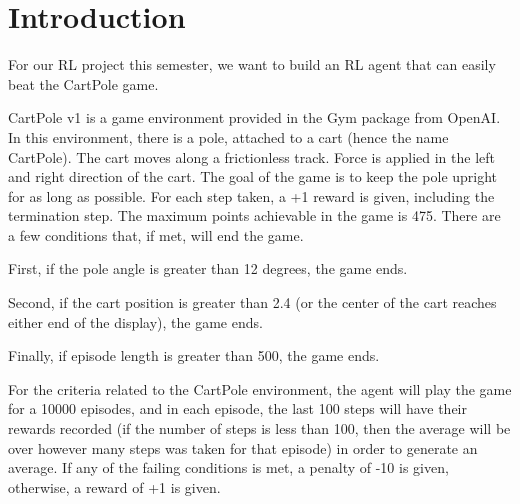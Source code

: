 \section{Introduction}

For our RL project this semester, we want to build an RL agent that can easily beat the CartPole game.  

CartPole v1 is a game environment provided in the Gym package from OpenAI. In this environment, there is a pole, attached to a cart (hence the name CartPole). The cart moves along a frictionless track. Force is applied in the left and right direction of the cart.
The goal of the game is to keep the pole upright for as long as possible. For each step taken, a +1 reward is given, including the termination step. The maximum points achievable in the game is 475. There are a few conditions that, if met, will end the game.

First, if the pole angle is greater than 12 degrees, the game ends.

Second, if the cart position is greater than 2.4 (or the center of the cart reaches either end of the display), the game ends.

Finally, if episode length is greater than 500, the game ends.

For the criteria related to the CartPole environment, the agent will play the game for a 10000 episodes, and in each episode, the last 100 steps will have their rewards recorded (if the number of steps is less than 100, then the average will be over however many steps was taken for that episode) in order to generate an average.
If any of the failing conditions is met, a penalty of -10 is given, otherwise, a reward of +1 is given.